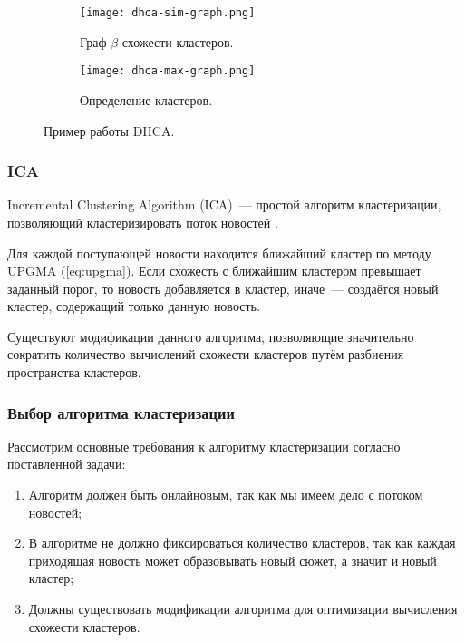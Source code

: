 \begin{figure}
    \centering
    \begin{subfigure}{.5\textwidth}
        \centering
        \texttt{[image: dhca-sim-graph.png]}
        \caption{Граф $\beta$-схожести кластеров.}
        \label{fig:beta-similarity}
    \end{subfigure}%
    \begin{subfigure}{.5\textwidth}
        \centering
        \texttt{[image: dhca-max-graph.png]}
        \caption{Определение кластеров.}
        \label{fig:max-similarity}
    \end{subfigure}
    \caption{Пример работы DHCA.}
\end{figure}

\subsubsection{ICA}
Incremental Clustering Algorithm (ICA)~--- простой алгоритм кластеризации, позволяющий кластеризировать поток новостей \cite{lonnberg13}.

Для каждой поступающей новости находится ближайший кластер по методу UPGMA (\ref{eq:upgma}). Если схожесть с ближайшим кластером превышает заданный порог, то новость добавляется в кластер, иначе~--- создаётся новый кластер, содержащий только данную новость.

Существуют модификации данного алгоритма, позволяющие значительно сократить количество вычислений схожести кластеров \cite{lonnberg13} путём разбиения пространства кластеров.

\subsubsection{Выбор алгоритма кластеризации} \label{sssec:clustering-comparision}
Рассмотрим основные требования к алгоритму кластеризации согласно поставленной задачи:
\begin{enumerate}
    \item Алгоритм должен быть онлайновым, так как мы имеем дело с потоком новостей;
    \item В алгоритме не должно фиксироваться количество кластеров, так как каждая приходящая новость может образовывать новый сюжет, а значит и новый кластер;
    \item Должны существовать модификации алгоритма для оптимизации вычисления схожести кластеров.
\end{enumerate}

